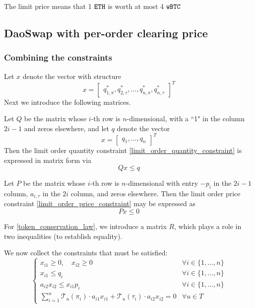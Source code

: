 \documentclass[11pt, reqno]{amsart}
\theoremstyle{definition}
\theoremstyle{remark}
\newcommand{\BTC}{\textnormal{\texttt{wBTC}}}
\newcommand{\ETH}{\textnormal{\texttt{ETH}}}
\begin{document}
The limit price means that 1 $\ETH$ is worth at most 4 $\BTC$

\subsection{DaoSwap with per-order clearing price}

\subsubsection{Combining the constraints}

Let $x$ denote the vector with structure
\[
    x =
    \begin{bmatrix}
        q_{1, \pi}^*, q_{2, \tau}^*, \ldots, q_{n, \pi}^*, q_{n, \tau}^*
    \end{bmatrix}^T
\]
Next we introduce the following matrices.

Let $Q$ be the matrix whose $i$-th row is $n$-dimensional, with a ``1" in the
column $2i - 1$ and zeros elsewhere, and let $q$ denote the vector
\[
    x =
    \begin{bmatrix}
        q_1, \ldots, q_n
    \end{bmatrix}^T
\]
Then the limit order quantity constraint
\eqref{limit_order_quantity_constraint}
is expressed in matrix form via
\[
    Q x \leq q
\]

Let $P$ be the matrix whose $i$-th row is $n$-dimensional with entry
$-p_i$ in the $2i - 1$ column, $a_{i, \tau}$ in the $2i$ column, and zeros
elsewhere. Then the limit order price constraint
\eqref{limit_order_price_constraint}
may be expressed as
\[
    P x \leq 0
\]

For \eqref{token_conservation_law}, we introduce a matrix $R$, which plays a
role in two inequalities (to establish equality).

We now collect the constraints that must be satisfied:
\begin{equation}
	\begin{cases}
        x_{i1} \geq 0, \quad x_{i2} \geq 0 & \forall i \in \{1, \ldots, n\} \\
        x_{i1} \leq q_i & \forall i \in \{1, \ldots, n\} \\
        a_{i2} x_{i2} \leq x_{i1} p_i & \forall i \in \{1, \ldots, n\} \\
        \sum_{i=1}^n \mathcal{T}_u(\pi_i) \cdot a_{i1} x_{i1}
        + \mathcal{T}_u(\tau_i) \cdot a_{i2} x_{i2}
        = 0 & \forall u \in T
	\end{cases}
\end{equation}
\end{document}
